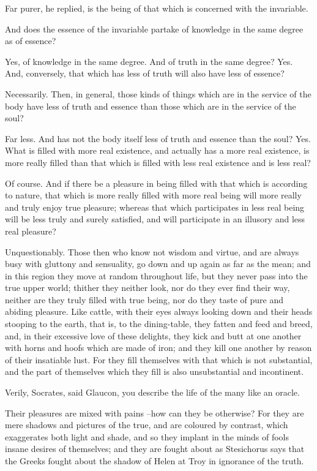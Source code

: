 Far purer, he replied, is the being of that which is concerned with the invariable.

And does the essence of the invariable partake of knowledge in the same degree as of essence?

Yes, of knowledge in the same degree.
And of truth in the same degree?
Yes.
And, conversely, that which has less of truth will also have less of essence?

Necessarily.
Then, in general, those kinds of things which are in the service of the body have less of truth and essence than those which are in the service of the soul?

Far less.
And has not the body itself less of truth and essence than the soul?
Yes.
What is filled with more real existence, and actually has a more real existence, is more really filled than that which is filled with less real existence and is less real?

Of course.
And if there be a pleasure in being filled with that which is according to nature, that which is more really filled with more real being will more really and truly enjoy true pleasure; whereas that which participates in less real being will be less truly and surely satisfied, and will participate in an illusory and less real pleasure?

Unquestionably.
Those then who know not wisdom and virtue, and are always busy with gluttony and sensuality, go down and up again as far as the mean; and in this region they move at random throughout life, but they never pass into the true upper world; thither they neither look, nor do they ever find their way, neither are they truly filled with true being, nor do they taste of pure and abiding pleasure. Like cattle, with their eyes always looking down and their heads stooping to the earth, that is, to the dining-table, they fatten and feed and breed, and, in their excessive love of these delights, they kick and butt at one another with horns and hoofs which are made of iron; and they kill one another by reason of their insatiable lust. For they fill themselves with that which is not substantial, and the part of themselves which they fill is also unsubstantial and incontinent.

Verily, Socrates, said Glaucon, you describe the life of the many like an oracle.

Their pleasures are mixed with pains --how can they be otherwise? For they are mere shadows and pictures of the true, and are coloured by contrast, which exaggerates both light and shade, and so they implant in the minds of fools insane desires of themselves; and they are fought about as Stesichorus says that the Greeks fought about the shadow of Helen at Troy in ignorance of the truth.


